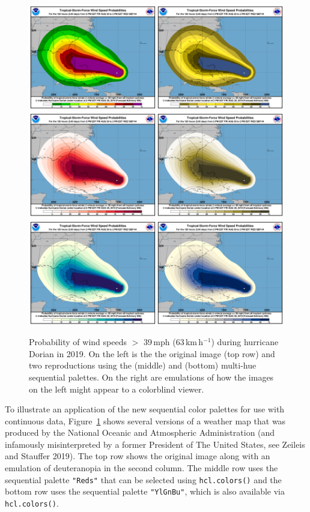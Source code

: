 \begin{figure}[t!]

{\centering \includegraphics[width=1\linewidth]{color_files/figure-latex/dorian-1} \includegraphics[width=1\linewidth]{color_files/figure-latex/dorian-2} \includegraphics[width=1\linewidth]{color_files/figure-latex/dorian-3} 

}

\caption{Probability of wind speeds $>$ 39\,mph (63\,km\,h$^{-1}$) during hurricane Dorian in 2019. On the left is the the original image (top row) and two reproductions using the  (middle) and  (bottom) multi-hue sequential palettes. On the right are emulations of how the images on the left might appear to a colorblind viewer.}\label{fig:dorian}
\end{figure}

To illustrate an application of the new sequential color palettes
for use with continuous data,
Figure~\ref{fig:dorian} shows several versions of a weather
map that was produced by the National Oceanic and Atmospheric Administration
(and infamously misinterpreted by a former President of The United States, see Zeileis and Stauffer 2019).
The top row shows the original image along with an emulation of
deuteranopia in the second column.
The middle row uses the sequential palette
\texttt{"Reds"} that can be selected using \texttt{hcl.colors()} and the
bottom row uses the sequential palette \texttt{"YlGnBu"}, which is also
available via \texttt{hcl.colors()}.

